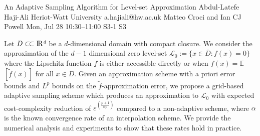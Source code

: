 \documentclass[12pt,lettersize,oneside]{book} %
\begin{document}
\begin{talk}
  {An Adaptive Sampling Algorithm for Level-set Approximation}%
  {Abdul-Latefe Haji-Ali}%
  {Heriot-Watt University}%
  {a.hajiali@hw.ac.uk}%
  {Matteo Croci and Ian CJ Powell}%
  {}%
  {Mon, Jul 28 10:30--11:00}%
  {S3-1}%
  {S3}%
  {}%
    

  Let $D\subset\joinrel\subset\rm{I\!R}$$^d$ be a $d$-dimensional domain with compact
closure. We consider the approximation of the $d-1$ dimensional zero level-set
$\mathcal{L}_0 := \{x \in \overline{D} : f(x) = 0\}$ where the Lipschitz function $f$ is either
accessible directly or when $f(x) = \mathbb{E}$$\left[\tilde{f}(x)\right]$ for
all $x \in \overline{D}$. Given an approximation scheme with a priori error bounds
and $L^p$ bounds on the $\tilde{f}$-approximation error, we propose a
grid-based adaptive sampling scheme which produces an approximation to $\mathcal{L}_0$
with expected cost-complexity reduction of $\varepsilon^{\left(\frac{p+1}{\alpha p}\right)}$
compared to a non-adaptive scheme, where $\alpha$ is the known convergence rate of
an interpolation scheme. We provide the numerical analysis and experiments to
show that these rates hold in practice.

\medskip


\end{talk}
\end{document}
